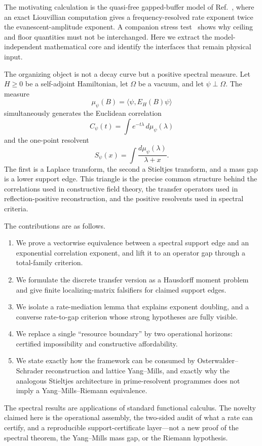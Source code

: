 \documentclass[11pt,a4paper]{article}
\theoremstyle{definition}
\theoremstyle{remark}
\begin{document}
The motivating calculation is the quasi-free gapped-buffer model of
Ref.~\cite{Eriksson0064}, where an exact Liouvillian computation gives a
frequency-resolved rate exponent twice the evanescent-amplitude exponent.  A
companion stress test~\cite{Eriksson0070} shows why ceiling and floor quantities
must not be interchanged.  Here we extract the model-independent mathematical
core and identify the interfaces that remain physical input.

The organizing object is not a decay curve but a positive spectral measure.
Let $H\geq0$ be a self-adjoint Hamiltonian, let $\Omega$ be a vacuum, and let
$\psi\perp\Omega$.  The measure
\[
  \mu_\psi(B)=\langle\psi,E_H(B)\psi\rangle
\]
simultaneously generates the Euclidean correlation
\[
  C_\psi(t)=\int e^{-t\lambda}\,d\mu_\psi(\lambda)
\]
and the one-point resolvent
\[
  S_\psi(x)=\int\frac{d\mu_\psi(\lambda)}{\lambda+x}.
\]
The first is a Laplace transform, the second a Stieltjes transform, and a mass
gap is a lower support edge.  This triangle is the precise common structure
behind the correlations used in constructive field theory, the transfer
operators used in reflection-positive reconstruction, and the positive
resolvents used in spectral criteria.

The contributions are as follows.
\begin{enumerate}
  \item We prove a vectorwise equivalence between a spectral support edge and
  an exponential correlation exponent, and lift it to an operator gap through
  a total-family criterion.
  \item We formulate the discrete transfer version as a Hausdorff moment
  problem and give finite localizing-matrix falsifiers for claimed support
  edges.
  \item We isolate a rate-mediation lemma that explains exponent doubling, and
  a converse rate-to-gap criterion whose strong hypotheses are fully visible.
  \item We replace a single ``resource boundary'' by two operational horizons:
  certified impossibility and constructive affordability.
  \item We state exactly how the framework can be consumed by
  Osterwalder--Schrader reconstruction and lattice Yang--Mills, and exactly why
  the analogous Stieltjes architecture in prime-resolvent programmes does not
  imply a Yang--Mills--Riemann equivalence.
\end{enumerate}

The spectral results are applications of standard functional calculus.  The
novelty claimed here is the operational assembly, the two-sided audit of what a
rate can certify, and a reproducible support-certificate layer---not a new proof
of the spectral theorem, the Yang--Mills mass gap, or the Riemann hypothesis.
\end{document}
